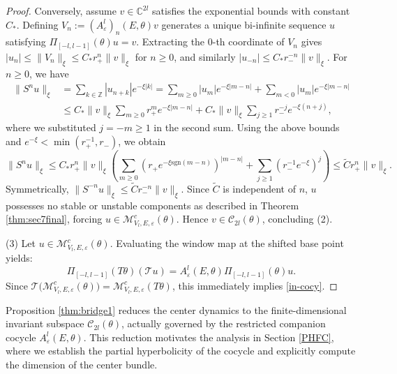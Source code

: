 \documentclass[reqno,11pt]{amsart}
\newcommand{\Z}{{\mathbb Z}}
\newcommand{\C}{{\mathbb C}}
\begin{document}
\begin{proof}
Conversely, assume $v \in \C^{2l}$ satisfies the exponential bounds with constant $C_*$. Defining $V_n := (A^{l}_\varepsilon)_{n}(E,\theta)v$ generates a unique bi-infinite sequence $u$ satisfying $\Pi_{[-l,l-1]}(\theta) u=v$. Extracting the $0$-th coordinate of $V_n$ gives $|u_n| \le \|V_n\|_\xi \le C_* r_+^n\|v\|_\xi$ for $n \ge 0$, and similarly $|u_{-n}| \le C_* r_-^{-n}\|v\|_\xi$. For $n \ge 0$, we have
$$
\begin{aligned}
\|S^nu\|_{\xi} &= \sum_{k\in\Z} |u_{n+k}|e^{-\xi |k|} = \sum_{m\ge 0}|u_m|e^{-\xi|m-n|} + \sum_{m < 0}|u_m|e^{-\xi|m-n|}\\
&\le C_*\|v\|_\xi \sum_{m\ge 0} r_+^m e^{-\xi|m-n|} + C_*\|v\|_\xi \sum_{j\ge 1} r_-^{-j} e^{-\xi(n+j)},
\end{aligned}
$$
where we substituted $j = -m \ge 1$ in the second sum. Using the above bounds and $e^{-\xi} < \min(r_+^{-1}, r_-)$, we obtain
$$
\|S^nu\|_{\xi} \le C_* r_+^n \|v\|_\xi \left( \sum_{m\ge0}(r_+e^{-\xi \text{sgn}(m-n)})^{|m-n|} + \sum_{j\ge1}(r_-^{-1}e^{-\xi})^j \right) \le \tilde{C} r_+^n \|v\|_\xi.
$$
Symmetrically, $\|S^{-n}u\|_\xi \le \tilde{C} r_-^{-n}\|v\|_\xi$. Since $\tilde{C}$ is independent of $n$, 
$u$ possesses no stable or unstable components  as described in  Theorem \ref{thm:sec7final}, forcing $u\in \mathcal M_{V_l,E,\varepsilon}^c(\theta)$. Hence 
$v \in \mathcal C_{2l}(\theta)$, concluding (2).

(3) Let $u\in \mathcal M_{V_l,E,\varepsilon}^c(\theta)$. Evaluating the window map at the shifted base point yields:
$$
\Pi_{[-l,l-1]}(T\theta)(\mathscr T u) = A_{\varepsilon}^{l}(E,\theta)\Pi_{[-l,l-1]}(\theta) u.
$$
Since $\mathscr T\bigl(\mathcal M_{V_l,E,\varepsilon}^c(\theta)\bigr) = \mathcal M_{V_l,E,\varepsilon}^c(T\theta)$, this immediately implies \eqref{in-cocy}.
\end{proof}


Proposition \ref{thm:bridge1}  reduces the center dynamics to the finite-dimensional invariant subspace $\mathcal C_{2l}(\theta)$, actually governed  by the restricted companion cocycle $A_{\varepsilon}^{l}(E,\theta)$. This  reduction motivates the analysis in Section \ref{PHFC}, where we establish the partial hyperbolicity of the cocycle and explicitly compute the dimension of the center bundle.
\end{document}
